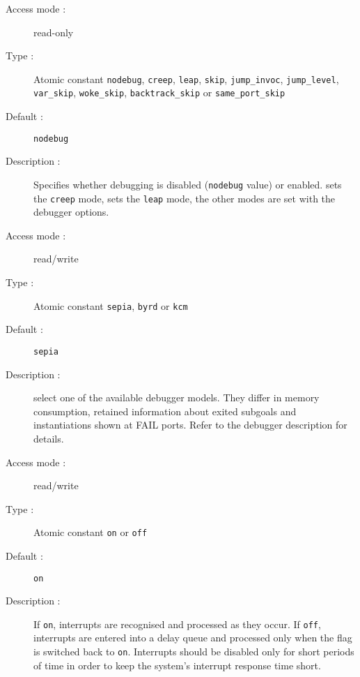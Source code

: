 \begin{description}
\begin{description}
\item[Access mode :] read-only
\item[Type :] Atomic constant {\tt nodebug}, {\tt creep}, {\tt leap}, {\tt skip}, {\tt jump_invoc}, {\tt jump_level}, {\tt var_skip}, {\tt woke_skip}, {\tt backtrack_skip} or {\tt same_port_skip}
\item[Default : ] {\tt nodebug}
\item[Description :] Specifies whether debugging is disabled
({\tt nodebug} value)
or enabled.  sets the {\tt creep} mode,  sets the 
{\tt leap} mode, the other modes are set with the debugger options.
\end{description}

\begin{description}
\item[Access mode :] read/write
\item[Type :] Atomic constant {\tt sepia}, {\tt byrd} or {\tt kcm}
\item[Default : ] {\tt sepia}
\item[Description :] select one of the available debugger models.
They differ in memory consumption, retained information about exited subgoals
and instantiations shown at FAIL ports. Refer to the debugger description
for details.
\end{description}


\begin{description}
\item[Access mode :] read/write
\item[Type :] Atomic constant {\tt on} or {\tt off}
\item[Default : ] {\tt on}
\item[Description :] If {\tt on}, interrupts are recognised and processed
as they occur. If {\tt off}, interrupts are entered into a delay queue and
processed only when the flag is switched back to {\tt on}.
Interrupts should be disabled only for short periods of time in order to keep
the system's interrupt response time short.
\end{description}


\end{description}
